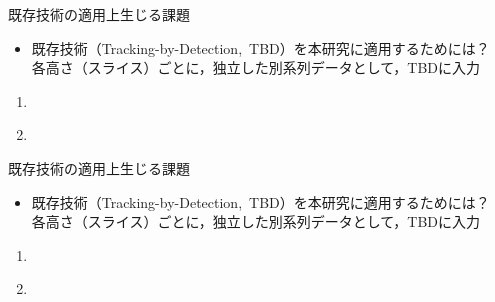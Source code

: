 \begin{frame}{既存技術の適用上生じる課題}
    \begin{itemize}
        \item 既存技術（Tracking-by-Detection,\ TBD）を本研究に適用するためには？
        \\\ra 各高さ（スライス）ごとに，独立した別系列データとして，TBDに入力
    \end{itemize}
    \vs
    \phantom{しかしながら，本研究においてはいくつか問題点}
    \begin{enumerate}
        \item[\phantom{}] 
        \\\phantom{\ra 細胞が高さ方向に運動すると，追跡が途切れる}
        \item[\phantom{}] 
        \\\phantom{\ra スライスを限定してるため，三次元的な情報が欠けている}
    \end{enumerate}
\end{frame}
\begin{frame}{既存技術の適用上生じる課題}
    \begin{itemize}
        \item 既存技術（Tracking-by-Detection,\ TBD）を本研究に適用するためには？
        \\\ra 各高さ（スライス）ごとに，独立した別系列データとして，TBDに入力
    \end{itemize}
    \phantom{しかしながら，本研究においてはいくつか問題点}
    \vs
    \begin{enumerate}
        \item[\phantom{}] 
        \\\phantom{\ra 細胞が高さ方向に運動すると，追跡が途切れる}
        \item[\phantom{}] 
        \\\phantom{\ra スライスを限定してるため，三次元的な情報が欠けている}
    \end{enumerate}
\end{frame}
